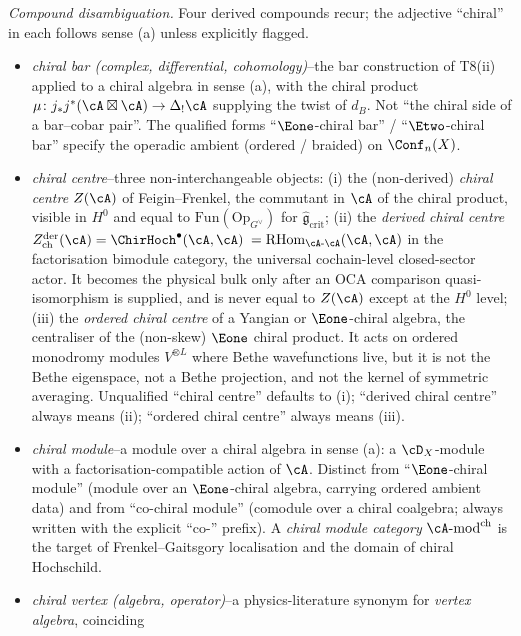 \begin{description}[itemsep=4pt, leftmargin=2.0em, style=nextline]
\emph{Compound disambiguation.} Four derived compounds recur; the
adjective ``chiral'' in each follows sense (a) unless explicitly
flagged.
\begin{itemize}
\item[T7($\alpha$)] \emph{chiral bar (complex, differential,
cohomology)}--the bar construction of T8(ii) applied to a chiral
algebra in sense (a), with the chiral product
$\mu\colon j_*j^*(\cA\boxtimes\cA)\to\Delta_!\cA$ supplying the
twist of $d_B$. Not ``the chiral side of a bar--cobar pair''.
The qualified forms ``$\Eone$-chiral bar'' / ``$\Etwo$-chiral bar''
specify the operadic ambient (ordered / braided) on
$\Conf_n(X)$.
\item[T7($\beta$)] \emph{chiral centre}--three non-interchangeable
objects: (i) the (non-derived) \emph{chiral centre} $Z(\cA)$ of
Feigin--Frenkel, the commutant in $\cA$ of the chiral product,
visible in $H^0$ and equal to $\mathrm{Fun}(\mathrm{Op}_{G^{\vee}})$
for $\widehat{\mathfrak{g}}_{\mathrm{crit}}$;
(ii) the \emph{derived chiral centre}
$Z^{\mathrm{der}}_{\mathrm{ch}}(\cA) = \ChirHoch^\bullet(\cA,\cA)$
$= \mathrm{RHom}_{\cA\text{-}\cA}(\cA,\cA)$ in the factorisation
bimodule category, the universal cochain-level closed-sector actor. It
becomes the physical bulk only after an OCA comparison quasi-isomorphism
is supplied, and is never equal to $Z(\cA)$ except at the $H^0$ level;
(iii) the \emph{ordered chiral centre} of a Yangian or
$\Eone$-chiral algebra, the centraliser of the (non-skew) $\Eone$
chiral product. It acts on ordered monodromy modules
$V^{\otimes L}$ where Bethe wavefunctions live, but it is not the
Bethe eigenspace, not a Bethe projection, and not the kernel of
symmetric averaging.
Unqualified ``chiral centre'' defaults to (i); ``derived chiral
centre'' always means (ii); ``ordered chiral centre'' always
means (iii).
\item[T7($\gamma$)] \emph{chiral module}--a module over a chiral
algebra in sense (a): a $\cD_X$-module with a
factorisation-compatible action of $\cA$. Distinct from
``$\Eone$-chiral module'' (module over an $\Eone$-chiral algebra,
carrying ordered ambient data) and from ``co-chiral module''
(comodule over a chiral coalgebra; always written with the
explicit ``co-'' prefix). A \emph{chiral module category}
$\cA\text{-}\mathrm{mod}^{\mathrm{ch}}$ is the target of
Frenkel--Gaitsgory localisation and the domain of chiral
Hochschild.
\item[T7($\delta$)] \emph{chiral vertex (algebra, operator)}--a
physics-literature synonym for \emph{vertex algebra}, coinciding

\end{itemize}
\end{description}
